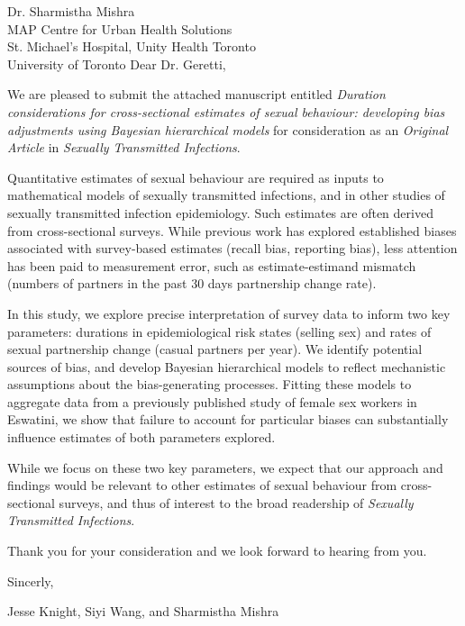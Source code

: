 \address{
  Dr. Anna Maria Geretti\\
  Editor-in-Chief\\
  Sexually Transmitted Infections
}{Dr. Sharmistha Mishra\\
  MAP Centre for Urban Health Solutions\\
  St. Michael's Hospital, Unity Health Toronto\\
  University of Toronto}
Dear Dr. Geretti,
\par
We are pleased to submit the attached manuscript entitled
\emph{Duration considerations for cross-sectional estimates of sexual behaviour:
  developing bias adjustments using Bayesian hierarchical models}
for consideration as an \emph{Original Article} in \emph{Sexually Transmitted Infections}.
\par
Quantitative estimates of sexual behaviour are required
as inputs to mathematical models of sexually transmitted infections,
and in other studies of sexually transmitted infection epidemiology.
Such estimates are often derived from cross-sectional surveys.
While previous work has explored established biases associated with survey-based estimates
(\eg recall bias, reporting bias),
less attention has been paid to measurement error, such as estimate-estimand mismatch
(\eg numbers of partners in the past 30 days \vs partnership change rate).
\par
In this study, we explore precise interpretation of survey data to inform two key parameters:
durations in epidemiological risk states (\eg selling sex) and
rates of sexual partnership change (\eg casual partners per year).
We identify potential sources of bias,
and develop Bayesian hierarchical models to reflect
mechanistic assumptions about the bias-generating processes.
Fitting these models to aggregate data from
a previously published study of female sex workers in Eswatini,
we show that failure to account for particular biases can
substantially influence estimates of both parameters explored.
\par
While we focus on these two key parameters,
we expect that our approach and findings would be relevant to
other estimates of sexual behaviour from cross-sectional surveys,
and thus of interest to the broad readership of \emph{Sexually Transmitted Infections}.
\par
Thank you for your consideration and we look forward to hearing from you.
\medskip\par
Sincerly,
\par
Jesse Knight, Siyi Wang, and Sharmistha Mishra
